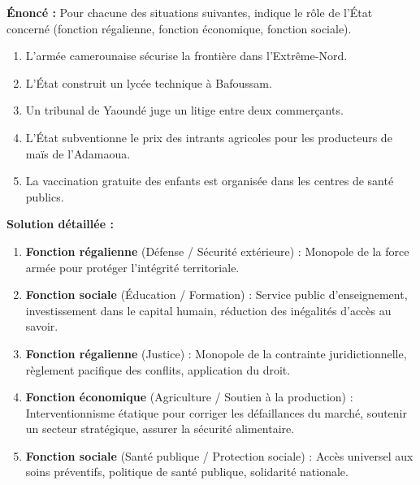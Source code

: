 \documentclass[11pt]{article}
\newcounter{popsec}
\newcounter{popsub}
\newcommand{\courssub}[1]{%
  \stepcounter{popsub}%
  \par\vspace{9pt}\noindent{\popxbold\fontsize{11.5}{13}\selectfont\color{popink}{\color{poporange}\thepopsec.\thepopsub}\hspace{6pt}#1}\par\nopagebreak\vspace{4pt}
}
\begin{document}
\begin{exoresolu}
\textbf{Énoncé :} Pour chacune des situations suivantes, indique le rôle de l'État concerné (fonction régalienne, fonction économique, fonction sociale).
\begin{enumerate}
\item L'armée camerounaise sécurise la frontière dans l'Extrême-Nord.
\item L'État construit un lycée technique à Bafoussam.
\item Un tribunal de Yaoundé juge un litige entre deux commerçants.
\item L'État subventionne le prix des intrants agricoles pour les producteurs de maïs de l'Adamaoua.
\item La vaccination gratuite des enfants est organisée dans les centres de santé publics.
\end{enumerate}
\tcblower
\textbf{Solution détaillée :}
\begin{enumerate}
\item \textbf{Fonction régalienne} (Défense / Sécurité extérieure) : Monopole de la force armée pour protéger l'intégrité territoriale.
\item \textbf{Fonction sociale} (Éducation / Formation) : Service public d'enseignement, investissement dans le capital humain, réduction des inégalités d'accès au savoir.
\item \textbf{Fonction régalienne} (Justice) : Monopole de la contrainte juridictionnelle, règlement pacifique des conflits, application du droit.
\item \textbf{Fonction économique} (Agriculture / Soutien à la production) : Interventionnisme étatique pour corriger les défaillances du marché, soutenir un secteur stratégique, assurer la sécurité alimentaire.
\item \textbf{Fonction sociale} (Santé publique / Protection sociale) : Accès universel aux soins préventifs, politique de santé publique, solidarité nationale.
\end{enumerate}
\end{exoresolu}

\courssub{Je m'entraîne}
\end{document}
